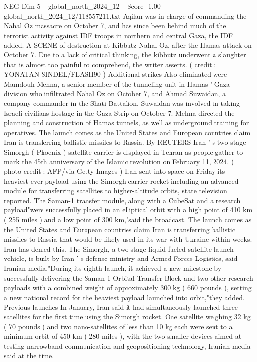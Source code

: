 \begin{textsample}{NEG Dim 5 – global\_north\_2024\_12 – Score -1.00 – global\_north\_2024\_12/118557211.txt}  \label{ex:f5_neg_352}
Aqilan was in charge of commanding the Nahal Oz massacre on October 7, and has since been behind much of the terrorist activity against IDF troops in northern and central Gaza, the IDF added.
A SCENE of destruction at Kibbutz Nahal Oz, after the Hamas attack on October 7.
Due to a lack of critical thinking, the kibbutz underwent a slaughter that is almost too painful to comprehend, the writer asserts. ( credit : YONATAN SINDEL/FLASH90 ) Additional strikes Also eliminated were Mamdouh Mehna, a senior member of the tunneling unit in Hamas ' Gaza division who infiltrated Nahal Oz on October 7, and Ahmad Suwaidan, a company commander in the Shati Battalion.
Suwaidan was involved in taking Israeli civilians hostage in the Gaza Strip on October 7.
Mehna directed the planning and construction of Hamas tunnels, as well as underground training for operatives.
The launch comes as the United States and European countries claim Iran is transferring ballistic missiles to Russia.
By REUTERS Iran ' s two-stage Simorgh ( Phoenix ) satellite carrier is displayed in Tehran as people gather to mark the 45th anniversary of the Islamic revolution on February 11, 2024. ( photo credit : AFP/via Getty Images ) Iran sent into space on Friday its heaviest-ever payload using the Simorgh carrier rocket including an advanced module for transferring satellites to higher-altitude orbits, state television reported.
The Saman-1 transfer module, along with a CubeSat and a research payload"were successfully placed in an elliptical orbit with a high point of 410 km ( 255 miles ) and a low point of 300 km,"said the broadcast.
The launch comes as the United States and European countries claim Iran is transferring ballistic missiles to Russia that would be likely used in its war with Ukraine within weeks.
Iran has denied this.
The Simorgh, a two-stage liquid-fueled satellite launch vehicle, is built by Iran ' s defense ministry and Armed Forces Logistics, said Iranian media."During its eighth launch, it achieved a new milestone by successfully delivering the Saman-1 Orbital Transfer Block and two other research payloads with a combined weight of approximately 300 kg ( 660 pounds ), setting a new national record for the heaviest payload launched into orbit,"they added.
Previous launches In January, Iran said it had simultaneously launched three satellites for the first time using the Simorgh rocket.
One satellite weighing 32 kg ( 70 pounds ) and two nano-satellites of less than 10 kg each were sent to a minimum orbit of 450 km ( 280 miles ), with the two smaller devices aimed at testing narrowband communication and geopositioning technology, Iranian media said at the time.

\end{textsample}
